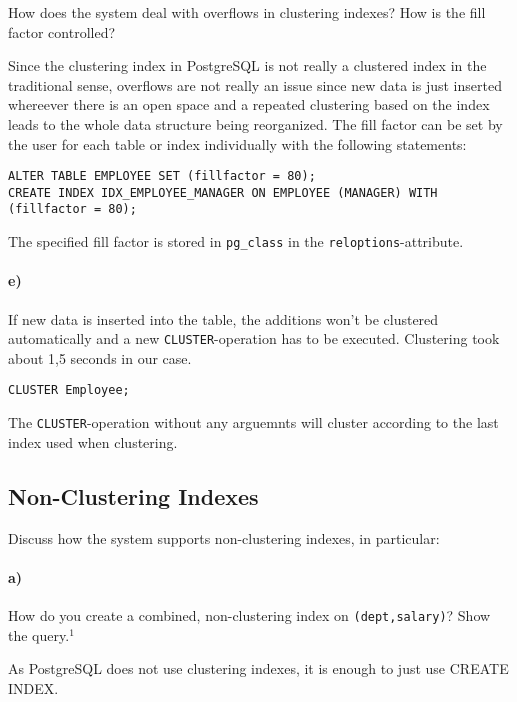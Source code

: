 \documentclass[11pt]{scrartcl}
\begin{document}
How does the system deal with overflows in clustering indexes? How is the fill factor controlled?

Since the clustering index in PostgreSQL is not really a clustered index in the traditional sense, overflows are not really an issue since new data is just inserted whereever there is an open space and a repeated clustering based on the index leads to the whole data structure being reorganized.
The fill factor can be set by the user for each table or index individually with the following statements:

\begin{lstlisting}[style=dbtsql]
ALTER TABLE EMPLOYEE SET (fillfactor = 80);
CREATE INDEX IDX_EMPLOYEE_MANAGER ON EMPLOYEE (MANAGER) WITH (fillfactor = 80);
\end{lstlisting}

The specified fill factor is stored in \texttt{pg\_class} in the \texttt{reloptions}-attribute.

\paragraph{e)}

If new data is inserted into the table, the additions won't be clustered automatically and a new \texttt{CLUSTER}-operation has to be executed. Clustering took about 1,5 seconds in our case.

\begin{lstlisting}[style=dbtsql]
CLUSTER Employee;
\end{lstlisting}

The \texttt{CLUSTER}-operation without any arguemnts will cluster according to the last index used when clustering.

\subsection{Non-Clustering Indexes}

Discuss how the system supports non-clustering indexes, in particular:


\paragraph{a)}

How do you create a combined, non-clustering index on \texttt{(dept,salary)}? Show the query.$^1$

As PostgreSQL does not use clustering indexes, it is enough to just use
CREATE INDEX.
\end{document}
